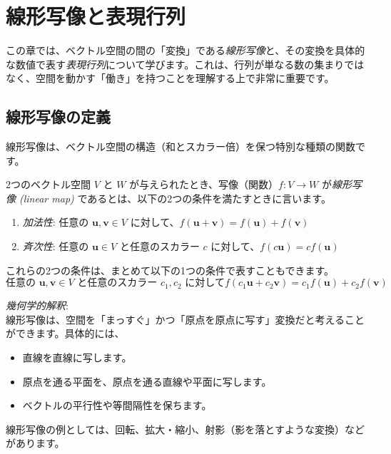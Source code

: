 \section{線形写像と表現行列} \setcounter{ex}{0}

この章では、ベクトル空間の間の「変換」である\emph{線形写像}と、その変換を具体的な数値で表す\emph{表現行列}について学びます。これは、行列が単なる数の集まりではなく、空間を動かす「働き」を持つことを理解する上で非常に重要です。

\subsection{線形写像の定義}

線形写像は、ベクトル空間の構造（和とスカラー倍）を保つ特別な種類の関数です。

\begin{dfn}[線形写像] \label{linear_map}
2つのベクトル空間 $V$ と $W$ が与えられたとき、写像（関数）$f: V \to W$ が\emph{線形写像 (linear map)} であるとは、以下の2つの条件を満たすときに言います。
\begin{enumerate}
\item \emph{加法性}: 任意の $\bm{u}, \bm{v} \in V$ に対して、$f(\bm{u} + \bm{v}) = f(\bm{u}) + f(\bm{v})$
\item \emph{斉次性}: 任意の $\bm{u} \in V$ と任意のスカラー $c$ に対して、$f(c\bm{u}) = c f(\bm{u})$
\end{enumerate}
これらの2つの条件は、まとめて以下の1つの条件で表すこともできます。
\[\text{任意の $\bm{u}, \bm{v} \in V$ と任意のスカラー $c_1, c_2$ に対して}f(c_1\bm{u} + c_2\bm{v}) = c_1 f(\bm{u}) + c_2 f(\bm{v})\]
\end{dfn}

\emph{幾何学的解釈}:\\
線形写像は、空間を「まっすぐ」かつ「原点を原点に写す」変換だと考えることができます。具体的には、
\begin{itemize}
\item 直線を直線に写します。
\item 原点を通る平面を、原点を通る直線や平面に写します。
\item ベクトルの平行性や等間隔性を保ちます。
\end{itemize}

線形写像の例としては、回転、拡大・縮小、射影（影を落とすような変換）などがあります。

